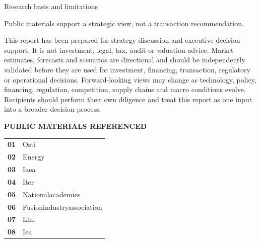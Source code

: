 \documentclass[10pt,a4paper]{article}
\begin{document}
\clearpage
\noindent{}\par\vspace{8pt}
{\sffamily\fontsize{22}{27}\selectfont\color{BONavy} Research basis and limitations}\par\vspace{9pt}
\begin{minipage}[t]{0.47\linewidth}
{\sffamily\fontsize{15}{20}\selectfont\color{BOGreen} Public materials support a strategic view, not a transaction recommendation.}\par\vspace{7pt}
{\footnotesize\color{BOText} This report has been prepared for strategy discussion and executive decision support. It is not investment, legal, tax, audit or valuation advice. Market estimates, forecasts and scenarios are directional and should be independently validated before they are used for investment, financing, transaction, regulatory or operational decisions. Forward-looking views may change as technology, policy, financing, regulation, competition, supply chains and macro conditions evolve. Recipients should perform their own diligence and treat this report as one input into a broader decision process.}\par
\end{minipage}\hfill\begin{minipage}[t]{0.46\linewidth}
{\textcolor{BOGreen}{\scriptsize\bfseries PUBLIC MATERIALS REFERENCED}}\par\vspace{5pt}
\begin{tabularx}{\linewidth}{p{8mm}Y}
\textcolor{BOGreen}{\bfseries 01} & {\scriptsize Osti} \\[4pt]
\textcolor{BOGreen}{\bfseries 02} & {\scriptsize Energy} \\[4pt]
\textcolor{BOGreen}{\bfseries 03} & {\scriptsize Iaea} \\[4pt]
\textcolor{BOGreen}{\bfseries 04} & {\scriptsize Iter} \\[4pt]
\textcolor{BOGreen}{\bfseries 05} & {\scriptsize Nationalacademies} \\[4pt]
\textcolor{BOGreen}{\bfseries 06} & {\scriptsize Fusionindustryassociation} \\[4pt]
\textcolor{BOGreen}{\bfseries 07} & {\scriptsize Llnl} \\[4pt]
\textcolor{BOGreen}{\bfseries 08} & {\scriptsize Iea} \\[4pt]
\end{tabularx}
\end{minipage}\par\vspace{12pt}
\end{document}
